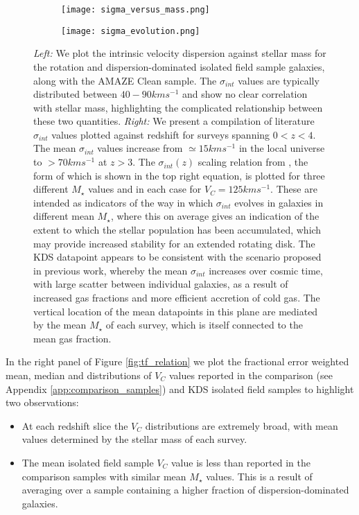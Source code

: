 \documentclass[fleqn,usenatbib]{mn2e}
\begin{document}
\begin{figure*}
    \centering \hspace{-1.3cm}
    \begin{subfigure}[h!]{0.5\textwidth}
        \centering
        \texttt{[image: sigma\_versus\_mass.png]}
    \end{subfigure} \hspace{0.4cm}
    \begin{subfigure}[h!]{0.5\textwidth}
        \centering
        \texttt{[image: sigma\_evolution.png]}
    \end{subfigure}
    \caption{{\it Left:} We plot the intrinsic velocity dispersion against stellar mass for the rotation and dispersion-dominated isolated field sample galaxies, along with the AMAZE Clean sample.
    The $\sigma_{int}$ values are typically distributed between $40-90kms^{-1}$ and show no clear correlation with stellar mass, highlighting the complicated relationship between these two quantities. 
    {\it Right:} We present a compilation of literature $\sigma_{int}$ values plotted against redshift for surveys spanning $0 < z < 4$.
    The mean $\sigma_{int}$ values increase from $\simeq15kms^{-1}$ in the local universe to $> 70kms^{-1}$ at $z > 3$.
    The $\sigma_{int}(z)$ scaling relation from \protect\cite{Wisnioski2015}, the form of which is shown in the top right equation, is plotted for three different $M_{\star}$ values and in each case for $V_{C} = 125kms^{-1}$.
    These are intended as indicators of the way in which $\sigma_{int}$ evolves in galaxies in different mean $M_{\star}$, where this on average gives an indication of the extent to which the stellar population has been accumulated, which may provide increased stability for an extended rotating disk.
    The KDS datapoint appears to be consistent with the scenario proposed in previous work, whereby the mean $\sigma_{int}$ increases over cosmic time, with large scatter between individual galaxies, as a result of increased gas fractions and more efficient accretion of cold gas.
    The vertical location of the mean datapoints in this plane are mediated by the mean $M_{\star}$ of each survey, which is itself connected to the mean gas fraction.} 
    \label{fig:sigma_and_v_sigma_w_redshift}
\end{figure*}

In the right panel of Figure \ref{fig:tf_relation} we plot the fractional error weighted mean, median and distributions of $V_{C}$ values reported in the comparison (see Appendix \ref{app:comparison_samples}) and KDS isolated field samples to highlight two observations:
\begin{itemize}
    \item At each redshift slice the $V_{C}$ distributions are extremely broad, with mean values determined by the stellar mass of each survey.
    \item The mean isolated field sample $V_{C}$ value is less than reported in the comparison samples with similar mean $M_{\star}$ values.
    This is a result of averaging over a sample containing a higher fraction of dispersion-dominated galaxies.
\end{itemize}
\end{document}
